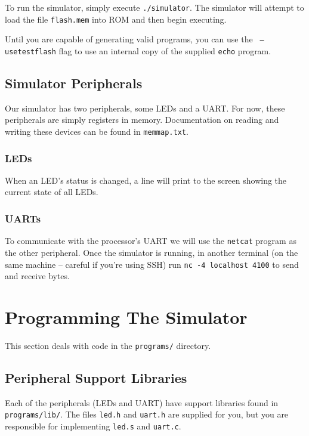 \documentclass{article}
\begin{document}
To run the simulator, simply execute {\tt ./simulator}. The simulator will
attempt to load the file {\tt flash.mem} into ROM and then begin executing.

Until you are capable of generating valid programs, you can use the {\tt
--usetestflash} flag to use an internal copy of the supplied {\tt echo}
program.

\subsection{Simulator Peripherals}

Our simulator has two peripherals, some LEDs and a UART. For now, these
peripherals are simply registers in memory. Documentation on reading and
writing these devices can be found in {\tt memmap.txt}.

\subsubsection{LEDs}

When an LED's status is changed, a line will print to the screen showing the
current state of all LEDs.

\subsubsection{UARTs}

To communicate with the processor's UART we will use the {\tt netcat} program
as the other peripheral. Once the simulator is running, in another terminal
(on the same machine -- careful if you're using SSH) run {\tt nc -4 localhost
4100} to send and receive bytes.

\section{Programming The Simulator}

This section deals with code in the {\tt programs/} directory.

\subsection{Peripheral Support Libraries}

Each of the peripherals (LEDs and UART) have support libraries found in {\tt
programs/lib/}. The files {\tt led.h} and {\tt uart.h} are supplied for you,
but you are responsible for implementing {\tt led.s} and {\tt uart.c}.
\end{document}
